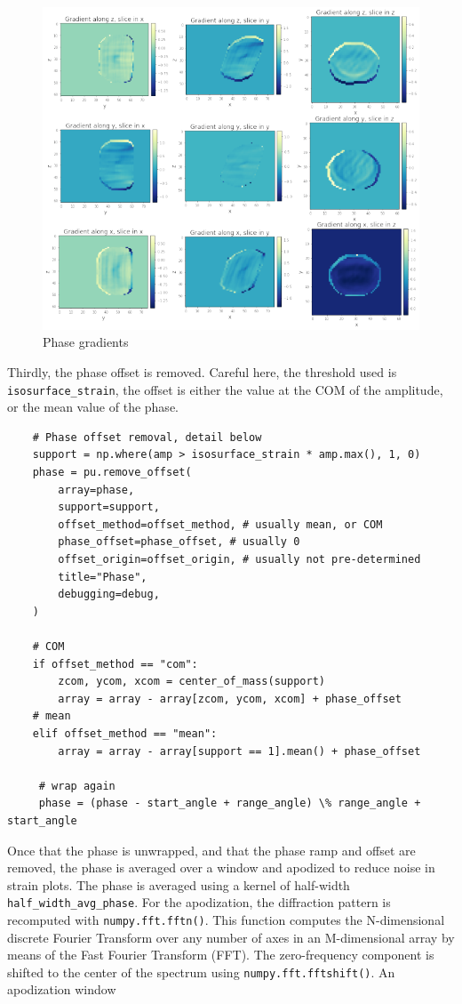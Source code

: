 \begin{figure}
    \centering
    \includegraphics[width=\textwidth]{Images/phase_grad.png}
    \caption{Phase gradients}
    \label{fig:phase_grad}
\end{figure}

Thirdly, the phase offset is removed. Careful here, the threshold used is \verb|isosurface_strain|, the offset is either the value at the COM of the amplitude, or the mean value of the phase.

\begin{verbatim}
    # Phase offset removal, detail below
    support = np.where(amp > isosurface_strain * amp.max(), 1, 0)
    phase = pu.remove_offset(
        array=phase,
        support=support,
        offset_method=offset_method, # usually mean, or COM
        phase_offset=phase_offset, # usually 0
        offset_origin=offset_origin, # usually not pre-determined
        title="Phase",
        debugging=debug,
    )
    
    # COM
    if offset_method == "com":
        zcom, ycom, xcom = center_of_mass(support)
        array = array - array[zcom, ycom, xcom] + phase_offset
    # mean
    elif offset_method == "mean":
        array = array - array[support == 1].mean() + phase_offset
        
     # wrap again
     phase = (phase - start_angle + range_angle) \% range_angle + start_angle
\end{verbatim}

Once that the phase is unwrapped, and that the phase ramp and offset are removed, the phase is averaged over a window and apodized to reduce noise in strain plots. The phase is averaged using a kernel of half-width \verb|half_width_avg_phase|. For the apodization, the diffraction pattern is recomputed with \verb|numpy.fft.fftn()|. This function computes the N-dimensional discrete Fourier Transform over any number of axes in an M-dimensional array by means of the Fast Fourier Transform (FFT). The zero-frequency component is shifted to the center of the spectrum using \verb|numpy.fft.fftshift()|.
An apodization window 

